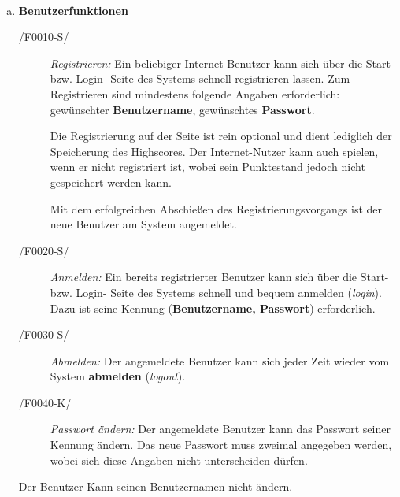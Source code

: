         \begin{loesung}\:
            \\[-.7cm]\begin{enumerate}[(a)]
                \setlength\itemsep{0.1px}
                \item 
                    \textbf{Benutzerfunktionen}
                    \begin{description}
                        \item[/F0010-S/]
                        \textit{Registrieren:} Ein beliebiger Internet-Benutzer kann sich über die Start- bzw. Login- Seite des Systems schnell registrieren lassen. Zum Registrieren sind mindestens folgende Angaben erforderlich: gewünschter \textbf{Benutzername}, gewünschtes \textbf{Passwort}.
                        
                        Die Registrierung auf der Seite ist rein optional und dient lediglich der Speicherung des Highscores. Der Internet-Nutzer kann auch spielen, wenn er nicht registriert ist, wobei sein Punktestand jedoch nicht gespeichert werden kann.
                        
                        Mit dem erfolgreichen Abschießen des Registrierungsvorgangs ist der neue Benutzer am System angemeldet.
                        
                        \item[/F0020-S/]
                        \textit{Anmelden:} Ein bereits registrierter Benutzer kann sich über die Start- bzw. Login- Seite des Systems schnell und bequem anmelden (\textit{login}). Dazu ist seine Kennung (\textbf{Benutzername, Passwort}) erforderlich.
                        
                        \item[/F0030-S/]
                        \textit{Abmelden:} Der angemeldete Benutzer kann sich jeder Zeit wieder vom System \textbf{abmelden} (\textit{logout}).
                        
                        \item[/F0040-K/]
                        \textit{Passwort ändern:} Der angemeldete Benutzer kann das Passwort seiner Kennung ändern. Das neue Passwort muss zweimal angegeben werden, wobei sich diese Angaben nicht unterscheiden dürfen.
                    \end{description}
                    Der Benutzer Kann seinen Benutzernamen nicht ändern.\\
                    

\end{enumerate}
\end{loesung}
